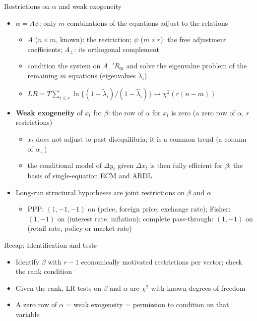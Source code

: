 \begin{frame}{Restrictions on $\alpha$ and weak exogeneity}
\itemsize{\small}
\begin{itemize}
    \item $\alpha = A\psi$: only $m$ combinations of the equations adjust to the relations
    \begin{itemize}
        \item $A$ ($n\times m$, known): the restriction; $\psi$ ($m\times r$): the free adjustment coefficients; $A_\perp$: its orthogonal complement
        \item condition the system on $A_\perp'R_{0t}$ and solve the eigenvalue problem of the remaining $m$ equations (eigenvalues $\tilde\lambda_i$)
        \item $LR = T\sum_{i\le r}\ln\{(1 - \tilde\lambda_i)/(1 - \hat\lambda_i)\} \to \chi^2(r(n - m))$
    \end{itemize}
    \item \textbf{Weak exogeneity} of $x_t$ for $\beta$: the row of $\alpha$ for $x_t$ is zero (a zero row of $\alpha$, $r$ restrictions)
    \begin{itemize}
        \item $x_t$ does not adjust to past disequilibria; it is a common trend (a column of $\alpha_\perp$)
        \item the conditional model of $\Delta y_t$ given $\Delta x_t$ is then fully efficient for $\beta$: the basis of single-equation ECM and ARDL
    \end{itemize}
    \item Long-run structural hypotheses are joint restrictions on $\beta$ and $\alpha$
    \begin{itemize}
        \item PPP: $(1, -1, -1)$ on (price, foreign price, exchange rate); Fisher: $(1, -1)$ on (interest rate, inflation); complete pass-through: $(1, -1)$ on (retail rate, policy or market rate)
    \end{itemize}
\end{itemize}
\end{frame}

\begin{frame}{Recap: Identification and tests}
\itemsize{\small}
\begin{itemize}
    \item Identify $\beta$ with $r - 1$ economically motivated restrictions per vector; check the rank condition
    \item Given the rank, LR tests on $\beta$ and $\alpha$ are $\chi^2$ with known degrees of freedom
    \item A zero row of $\alpha$ = weak exogeneity = permission to condition on that variable
\end{itemize}
\end{frame}


